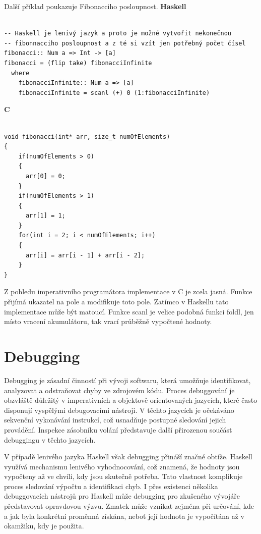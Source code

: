 \documentclass[male,czech]{kithesis}
\begin{document}
Další příklad poukazuje Fibonacciho posloupnost.
\textbf{Haskell}
\begin{verbatim}

-- Haskell je lenivý jazyk a proto je možné vytvořit nekonečnou 
-- fibonnacciho posloupnost a z té si vzít jen potřebný počet čísel 
fibonacci:: Num a => Int -> [a]
fibonacci = (flip take) fibonacciInfinite
  where
    fibonacciInfinite:: Num a => [a]
    fibonacciInfinite = scanl (+) 0 (1:fibonacciInfinite)

\end{verbatim}


\textbf{C}
\begin{verbatim}

void fibonacci(int* arr, size_t numOfElements)
{
    if(numOfElements > 0)
    {
      arr[0] = 0;
    }
    if(numOfElements > 1)
    {
      arr[1] = 1;
    }
    for(int i = 2; i < numOfElements; i++)
    {
      arr[i] = arr[i - 1] + arr[i - 2];
    }
}

\end{verbatim}

Z pohledu imperativního programátora implementace v C je zcela jasná. Funkce přijímá ukazatel na
pole a modifikuje toto pole. Zatímco v Haskellu tato implementace může být matoucí. Funkce scanl je 
velice podobná funkci foldl, jen místo vracení akumulátoru, tak vrací průběžně vypočtené hodnoty.

\section{Debugging}

Debugging je zásadní činností při vývoji softwaru, která umožňuje identifikovat, 
analyzovat a odstraňovat chyby ve zdrojovém kódu. 
Proces debuggování je obzvláště důležitý v imperativních a objektově orientovaných jazycích, 
které často disponují vyspělými debugovacími nástroji. 
V těchto jazycích je očekáváno sekvenční vykonávání instrukcí, 
což usnadňuje postupné sledování jejich provádění. 
Inspekce zásobníku volání představuje 
další přirozenou součást debuggingu v těchto jazycích.

V případě lenivého jazyka Haskell však debugging přináší značné obtíže. 
Haskell využívá mechanismu lenivého vyhodnocování, což znamená, 
že hodnoty jsou vypočteny až ve chvíli, kdy jsou skutečně potřeba. 
Tato vlastnost komplikuje proces sledování výpočtu a identifikaci chyb. 
I přes existenci několika debuggovacích nástrojů pro Haskell může 
debugging pro zkušeného vývojáře představovat opravdovou výzvu. 
Zmatek může vznikat zejména při určování, 
kde a jak byla konkrétní proměnná získána, 
neboť její hodnota je vypočítána až v okamžiku, 
kdy je použita.
\end{document}

